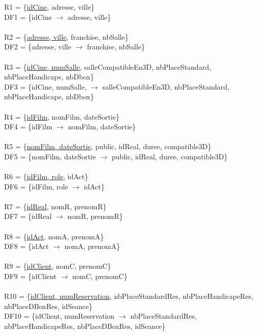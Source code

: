 \documentclass[a4paper,sffamily,12pt]{article}
\begin{document}
				\noindent R1 = \{\underline{idCine}, adresse, ville\} \\  DF1 = \{idCine $\rightarrow$ adresse, ville\} \\
				\\
				R2 = \{\underline{adresse, ville}, franchise, nbSalle\} \\ DF2 = \{adresse, ville $\rightarrow$ franchise, nbSalle\} \\
				\\
				R3 = \{\underline{idCine, numSalle}, salleCompatibleEn3D, nbPlaceStandard, nbPlaceHandicape, nbDbox\} \\ DF3 = \{idCine, numSalle, $\rightarrow$ salleCompatibleEn3D, nbPlaceStandard, nbPlaceHandicape, nbDbox\} \\
				\\
				R4 = \{\underline{idFilm}, nomFilm, dateSortie\} \\ DF4 = \{idFilm $\rightarrow$ nomFilm, dateSortie\} \\
				\\
				R5 = \{\underline{nomFilm, dateSortie}, public, idReal, duree, compatible3D\} \\ DF5 = \{nomFilm, dateSortie $\rightarrow$ public, idReal, duree, compatible3D\} \\	
				\\							
				R6 = \{\underline{idFilm, role}, idAct\} \\ DF6 = \{idFilm, role $\rightarrow$  idAct\} \\
				\\
				R7 = \{\underline{idReal}, nomR, prenomR\} \\ DF7 = \{idReal $\rightarrow$ nomR, prenomR\} \\
				\\
				R8 = \{\underline{idAct}, nomA, prenomA\} \\ DF8 = \{idAct $\rightarrow$ nomA, prenomA\} \\
				\\
				R9 = \{\underline{idClient}, nomC, prenomC\} \\ DF9 = \{idClient $\rightarrow$ nomC, prenomC\} \\ 
				\\
				R10 = \{\underline{idClient, numReservation}, nbPlaceStandardRes, nbPlaceHandicapeRes, nbPlaceDBoxRes, idSeance\} \\ DF10 = \{idClient, numReservation $\rightarrow$  nbPlaceStandardRes, nbPlaceHandicapeRes, nbPlaceDBoxRes, idSeance\} \\
				
\end{document}
